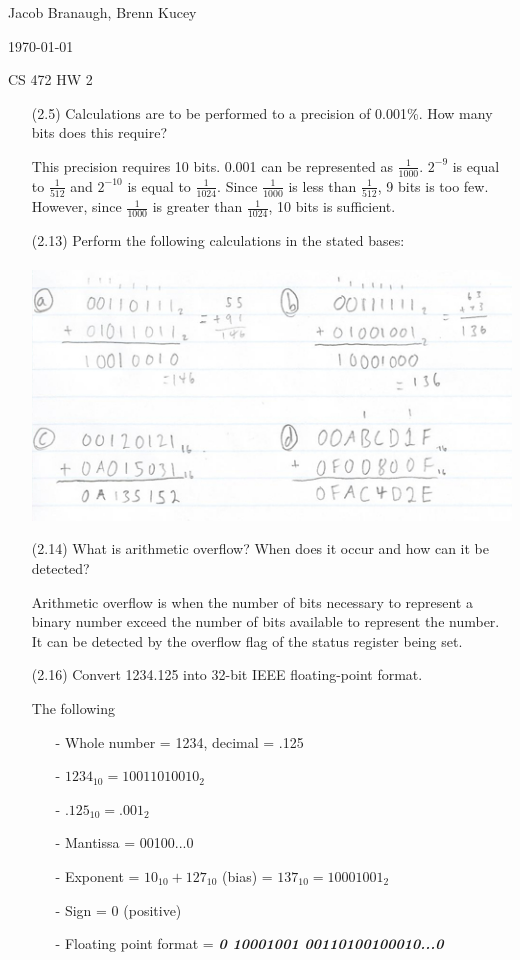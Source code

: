 \documentclass[letterpaper,10pt,titlepage]{article}
\def\name{Jacob Branaugh, Brenn Kucey}
\begin{document}
\hfill \name

\hfill \today

\hfill CS 472 HW 2

\begin{enumerate}
\item[(2.5)] Calculations are to be performed to a precision of 0.001\%. How many bits
	does this require?
  \item[\textbullet] This precision requires 10 bits. 0.001 can be represented as
	$\frac{1}{1000}$. $2^{-9}$ is equal to $\frac{1}{512}$ and $2^{-10}$ is equal to
	$\frac{1}{1024}$. Since $\frac{1}{1000}$ is less than $\frac{1}{512}$, 9 bits is
	too few. However, since $\frac{1}{1000}$ is greater than $\frac{1}{1024}$, 10
	bits is sufficient.

\item[(2.13)] Perform the following calculations in the stated bases:
  \\
  \\
  \includegraphics{problem13.jpg}

\item[(2.14)] What is arithmetic overflow? When does it occur and how can it be detected?
  \item[\textbullet] Arithmetic overflow is when the number of bits necessary to represent
	  a binary number exceed the number of bits available to represent the number.
	  It can be detected by the overflow flag of the status register being set.

\item[(2.16)] Convert 1234.125 into 32-bit IEEE floating-point format.
  \item[\textbullet] The following
    \begin{enumerate} 
      \item[-] Whole number = 1234, decimal = .125
      \item[-] $1234_{10} = 10011010010_{2}$
      \item[-] $.125_{10} = .001_{2}$
      \item[-] Mantissa = 00100...0
      \item[-] Exponent = $10_{10} + 127_{10}$ (bias) = $137_{10} = 10001001_{2}$
      \item[-] Sign = 0 (positive)
      \item[-] Floating point format =
	      {\large\textit{\textbf{0 10001001 00110100100010...0}}}
    \end{enumerate}


\end{enumerate}
\end{document}
